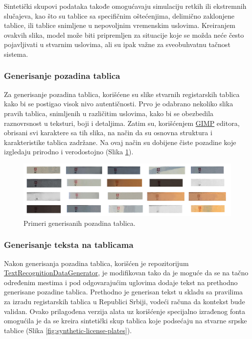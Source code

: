 \documentclass[a4paper,12pt]{article}
\begin{document}
	Sintetički skupovi podataka takođe omogućavaju simulaciju retkih ili ekstremnih slučajeva, kao što su tablice sa specifičnim oštećenjima, delimično zaklonjene tablice, ili tablice snimljene u nepovoljnim vremenskim uslovima. Kreiranjem ovakvih slika, model može biti pripremljen za situacije koje se možda neće često pojavljivati u stvarnim uslovima, ali su ipak važne za sveobuhvatnu tačnost sistema.
	
	\subsubsection{Generisanje pozadina tablica}
	
	Za generisanje pozadina tablica, korišćene su slike stvarnih registarskih tablica kako bi se postigao visok nivo autentičnosti. Prvo je odabrano nekoliko slika pravih tablica, snimljenih u različitim uslovima, kako bi se obezbedila raznovrsnost u teksturi, boji i detaljima. Zatim su, korišćenjem \href{https://www.gimp.org/}{GIMP} editora, obrisani svi karaktere sa tih slika, na način da su osnovna struktura i karakteristike tablica zadržane. Na ovaj način su dobijene čiste pozadine koje izgledaju prirodno i verodostojno (Slika \ref{fig:license-plate-backgrounds}).
	
	\begin{figure}[H]
		\centering
		\includegraphics[width=\textwidth]{assets/license-plate-backgrounds.png}
		\caption{Primeri generisanih pozadina tablica.}
		\label{fig:license-plate-backgrounds}
	\end{figure}
	
	\subsubsection{Generisanje teksta na tablicama}
	
	Nakon generisanja pozadina tablica, korišćen je repozitorijum \href{https://github.com/Belval/TextRecognitionDataGenerator}{TextRecognitionDataGenerator}, je modifikovan tako da je moguće da se na tačno određenim mestima i pod odgovarajućim uglovima dodaje tekst na prethodno generisane pozadine tablica. Prethodno je generisan tekst u skladu sa pravilima za izradu registarskih tablica u Republici Srbiji, vodeći računa da kontekst bude validan. Ovako prilagođena verzija alata uz korišćenje specijalno izrađenog fonta omogućila je da se kreira sintetički skup tablica koje podsećaju na stvarne srpske tablice (Slika \ref{fig:synthetic-license-plates}).
	
\end{document}
